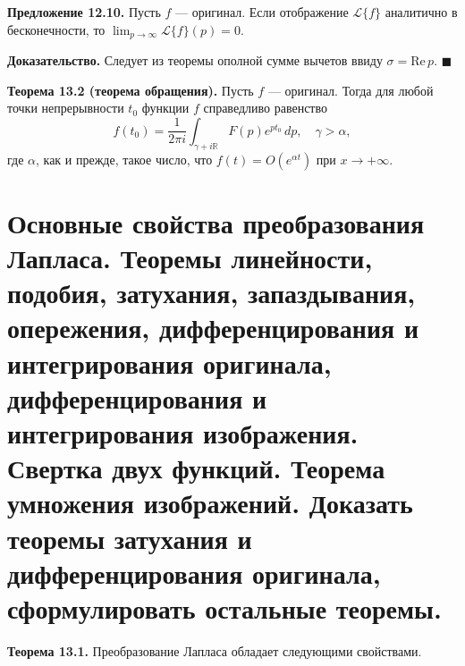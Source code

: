 \documentclass[12pt, a4paper]{article}
\theoremstyle{definition}
\theoremstyle{remark}
\begin{document}
\vspace{0.5em}
\textbf{Предложение 12.10.} Пусть $f$ --- оригинал. Если отображение $\mathcal{L}\{f\}$ аналитично в бесконечности, то $\lim_{p \to \infty} \mathcal{L}\{f\}(p) = 0$.

\textbf{Доказательство.} Следует из теоремы ополной сумме вычетов ввиду $\sigma = \text{Re} \, p$. $\blacksquare$

\textbf{Теорема 13.2 (теорема обращения).} Пусть $f$ --- оригинал. Тогда для любой точки непрерывности $t_0$ функции $f$ справедливо равенство
\begin{equation}
	f(t_0) = \frac{1}{2\pi i} \int_{\gamma + i\mathbb{R}} F(p) e^{pt_0} \, dp, \quad \gamma > \alpha,
\end{equation}
где $\alpha$, как и прежде, такое число, что $f(t) = O(e^{\alpha t})$ при $x \to +\infty$.


\newpage
\section{Основные свойства преобразования Лапласа. Теоремы линейности, подобия, затухания, запаздывания, опережения, дифференцирования и интегрирования оригинала, дифференцирования и интегрирования изображения. Свертка двух функций. Теорема умножения изображений. Доказать теоремы затухания и дифференцирования оригинала, сформулировать остальные теоремы.}

\textbf{Теорема 13.1.} Преобразование Лапласа обладает следующими свойствами.
\end{document}
